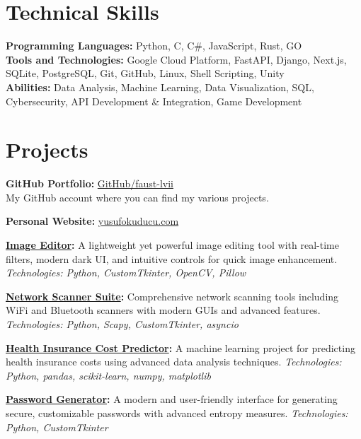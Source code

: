 \documentclass[10pt,a4paper]{extarticle}
\begin{document}
\section{Technical Skills}
\textbf{Programming Languages:} Python, C, C\#, JavaScript, Rust, GO\\
\textbf{Tools and Technologies:} Google Cloud Platform, FastAPI, Django, Next.js, SQLite, PostgreSQL, Git, GitHub, Linux, Shell Scripting, Unity\\
\textbf{Abilities:} Data Analysis, Machine Learning, Data Visualization, SQL, Cybersecurity, API Development \& Integration, Game Development

\vspace{10pt}

\section{Projects}
\textbf{GitHub Portfolio:} \href{https://github.com/faust-lvii}{GitHub/faust-lvii}\\
My GitHub account where you can find my various projects.

\vspace{5pt}
\noindent\textbf{Personal Website:} \href{https://yusufokuducu.com}{yusufokuducu.com}

\vspace{5pt}
\noindent\textbf{\href{https://github.com/faust-lvii/Image_Editor}{Image Editor}:} A lightweight yet powerful image editing tool with real-time filters, modern dark UI, and intuitive controls for quick image enhancement. \textit{Technologies: Python, CustomTkinter, OpenCV, Pillow}

\vspace{5pt}
\noindent\textbf{\href{https://github.com/faust-lvii/Wifi-Scanner}{Network Scanner Suite}:} Comprehensive network scanning tools including WiFi and Bluetooth scanners with modern GUIs and advanced features. \textit{Technologies: Python, Scapy, CustomTkinter, asyncio}

\vspace{5pt}
\noindent\textbf{\href{https://github.com/faust-lvii/GlobalAIHub_MCA}{Health Insurance Cost Predictor}:} A machine learning project for predicting health insurance costs using advanced data analysis techniques. \textit{Technologies: Python, pandas, scikit-learn, numpy, matplotlib}

\vspace{5pt}
\noindent\textbf{\href{https://github.com/faust-lvii/Password_Generator}{Password Generator}:} A modern and user-friendly interface for generating secure, customizable passwords with advanced entropy measures. \textit{Technologies: Python, CustomTkinter}
\end{document}
